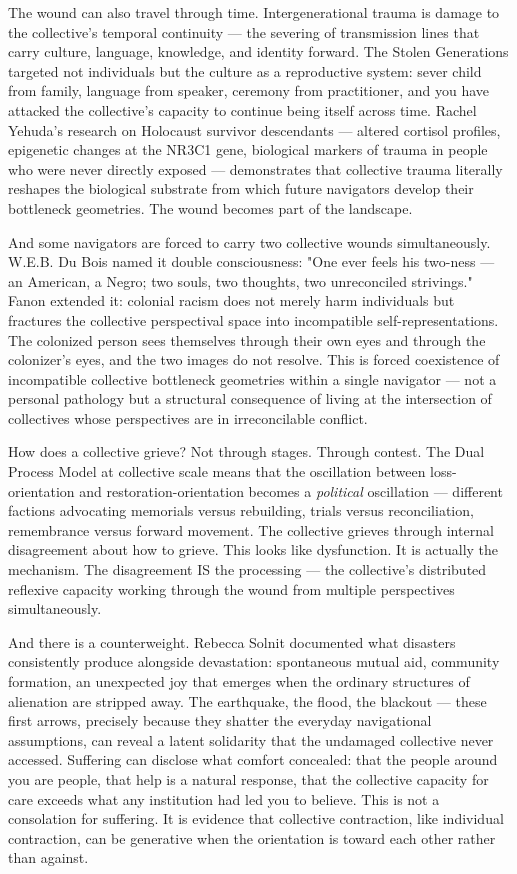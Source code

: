 The wound can also travel through time. Intergenerational trauma is damage to the collective's temporal continuity — the severing of transmission lines that carry culture, language, knowledge, and identity forward. The Stolen Generations targeted not individuals but the culture as a reproductive system: sever child from family, language from speaker, ceremony from practitioner, and you have attacked the collective's capacity to continue being itself across time. Rachel Yehuda's research on Holocaust survivor descendants — altered cortisol profiles, epigenetic changes at the NR3C1 gene, biological markers of trauma in people who were never directly exposed — demonstrates that collective trauma literally reshapes the biological substrate from which future navigators develop their bottleneck geometries. The wound becomes part of the landscape.


And some navigators are forced to carry two collective wounds simultaneously. W.E.B. Du Bois named it double consciousness: "One ever feels his two-ness — an American, a Negro; two souls, two thoughts, two unreconciled strivings." Fanon extended it: colonial racism does not merely harm individuals but fractures the collective perspectival space into incompatible self-representations. The colonized person sees themselves through their own eyes and through the colonizer's eyes, and the two images do not resolve. This is forced coexistence of incompatible collective bottleneck geometries within a single navigator — not a personal pathology but a structural consequence of living at the intersection of collectives whose perspectives are in irreconcilable conflict.


How does a collective grieve? Not through stages. Through contest. The Dual Process Model at collective scale means that the oscillation between loss-orientation and restoration-orientation becomes a \textit{political} oscillation — different factions advocating memorials versus rebuilding, trials versus reconciliation, remembrance versus forward movement. The collective grieves through internal disagreement about how to grieve. This looks like dysfunction. It is actually the mechanism. The disagreement IS the processing — the collective's distributed reflexive capacity working through the wound from multiple perspectives simultaneously.


And there is a counterweight. Rebecca Solnit documented what disasters consistently produce alongside devastation: spontaneous mutual aid, community formation, an unexpected joy that emerges when the ordinary structures of alienation are stripped away. The earthquake, the flood, the blackout — these first arrows, precisely because they shatter the everyday navigational assumptions, can reveal a latent solidarity that the undamaged collective never accessed. Suffering can disclose what comfort concealed: that the people around you are people, that help is a natural response, that the collective capacity for care exceeds what any institution had led you to believe. This is not a consolation for suffering. It is evidence that collective contraction, like individual contraction, can be generative when the orientation is toward each other rather than against.


